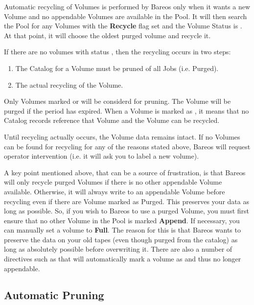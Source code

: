 Automatic recycling of Volumes is performed by Bareos only when it wants a
new Volume and no appendable Volumes are available in the Pool. It will then
search the Pool for any Volumes with the {\bf Recycle} flag set and the
Volume Status is . At that point, it will choose the oldest
purged volume and recycle it.

If there are no volumes with status , then
the recycling occurs in two steps:
\begin{enumerate}
  \item The Catalog for a Volume must be pruned of all Jobs (i.e.
Purged).
  \item The actual recycling of the Volume.
\end{enumerate}

Only Volumes marked  or  will
be considerd for pruning.  The Volume will be purged if the 
period has expired.  When a Volume is marked as , it means that no
Catalog records reference that Volume and the Volume can be recycled.

Until recycling actually occurs, the Volume data remains intact.  If no
Volumes can be found for recycling for any of the reasons stated above,
Bareos will request operator intervention (i.e.  it will ask you to label a
new volume).

A key point mentioned above, that can be a source of frustration, is that Bareos
will only recycle purged Volumes if there is no other appendable Volume
available.
Otherwise, it will always write to an appendable Volume before
recycling even if there are Volume marked as Purged. This preserves your data
as long as possible. So, if you wish to  Bareos to use a purged
Volume, you must first ensure that no other Volume in the Pool is marked {\bf
Append}. If necessary, you can manually set a volume to {\bf Full}. The reason
for this is that Bareos wants to preserve the data on your old tapes (even
though purged from the catalog) as long as absolutely possible before
overwriting it. There are also a number of directives such as
 that will automatically mark a volume as 
and thus no longer appendable.

\subsection{Automatic Pruning}
\label{AutoPruning}

